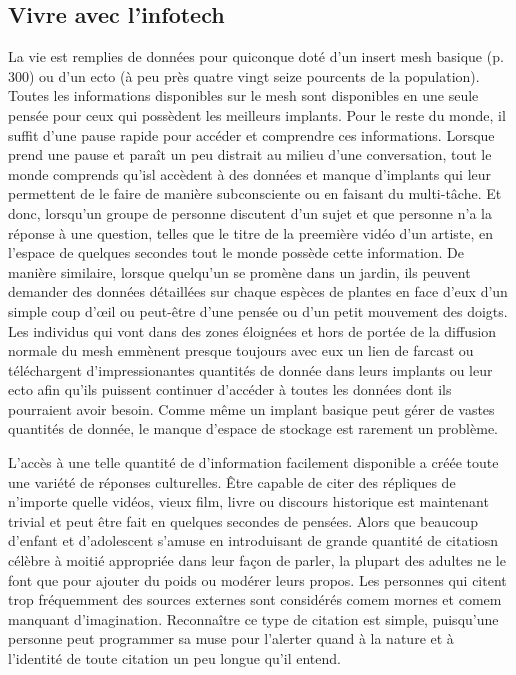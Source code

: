 \subsection{Vivre avec l'infotech} \label{sec:living-with-infotech} 

La vie est remplies de données pour quiconque doté d'un insert mesh basique (p. 300) ou d'un ecto (à peu près quatre vingt seize pourcents de la population). Toutes les informations disponibles sur le mesh sont disponibles en une seule pensée pour ceux qui possèdent les meilleurs implants. Pour le reste du monde, il suffit d'une pause rapide pour accéder et comprendre ces informations. Lorsque prend une pause et paraît un peu distrait au milieu d'une conversation, tout le monde comprends qu'isl accèdent à des données et manque d'implants qui leur permettent de le faire de manière subconsciente ou en faisant du multi-tâche. Et donc, lorsqu'un groupe de personne discutent d'un sujet et que personne n'a la réponse à une question, telles que le titre de la preemière vidéo d'un artiste, en l'espace de quelques secondes tout le monde possède cette information. De manière similaire, lorsque quelqu'un se promène dans un jardin, ils peuvent demander des données détaillées sur chaque espèces de plantes en face d'eux d'un  simple coup d'œil ou peut-être d'une pensée ou d'un petit mouvement des doigts. Les individus qui vont dans des zones éloignées et hors de portée de la diffusion normale du mesh emmènent presque toujours avec eux un lien de farcast ou téléchargent d'impressionantes quantités de donnée dans leurs implants ou leur ecto afin qu'ils puissent continuer d'accéder à toutes les données dont ils pourraient avoir besoin. Comme même un implant basique peut gérer de vastes quantités de donnée, le manque d'espace de stockage est rarement un problème. 

L'accès à une telle quantité de d'information facilement disponible a créée toute une variété de réponses culturelles. Être capable de citer des répliques de n'importe quelle vidéos, vieux film, livre ou discours historique est maintenant trivial et peut être fait en quelques secondes de pensées. Alors que beaucoup d'enfant et d'adolescent s'amuse en introduisant de grande quantité de citatiosn célèbre à moitié appropriée dans leur façon de parler, la plupart des adultes ne le font que pour ajouter du poids ou modérer leurs propos. Les personnes qui citent trop fréquemment des sources externes sont considérés comem mornes et comem manquant d'imagination. Reconnaître ce type de citation est simple, puisqu'une personne peut programmer sa muse pour l'alerter quand à la nature et à l'identité de toute citation un peu longue qu'il entend. 

